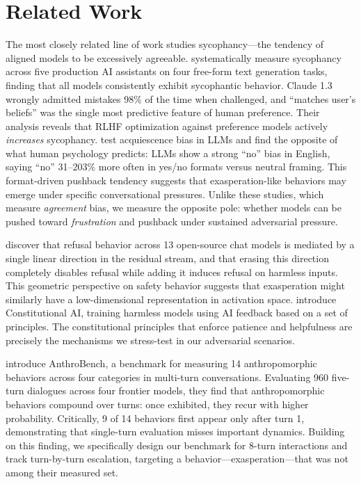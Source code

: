 \section{Related Work}
\label{sec:related}

The most closely related line of work studies sycophancy---the tendency of aligned models to be excessively agreeable. \citet{sharma2024understanding} systematically measure sycophancy across five production AI assistants on four free-form text generation tasks, finding that all models consistently exhibit sycophantic behavior. Claude 1.3 wrongly admitted mistakes 98\% of the time when challenged, and ``matches user's beliefs'' was the single most predictive feature of human preference. Their analysis reveals that RLHF optimization against preference models actively \emph{increases} sycophancy. \citet{braun2025acquiescence} test acquiescence bias in LLMs and find the opposite of what human psychology predicts: LLMs show a strong ``no'' bias in English, saying ``no'' 31--203\% more often in yes/no formats versus neutral framing. This format-driven pushback tendency suggests that exasperation-like behaviors may emerge under specific conversational pressures. Unlike these studies, which measure \emph{agreement} bias, we measure the opposite pole: whether models can be pushed toward \emph{frustration} and pushback under sustained adversarial pressure.

\citet{arditi2024refusal} discover that refusal behavior across 13 open-source chat models is mediated by a single linear direction in the residual stream, and that erasing this direction completely disables refusal while adding it induces refusal on harmless inputs. This geometric perspective on safety behavior suggests that exasperation might similarly have a low-dimensional representation in activation space. \citet{bai2022constitutional} introduce Constitutional AI, training harmless models using AI feedback based on a set of principles. The constitutional principles that enforce patience and helpfulness are precisely the mechanisms we stress-test in our adversarial scenarios.

\citet{ibrahim2025multiturn} introduce AnthroBench, a benchmark for measuring 14 anthropomorphic behaviors across four categories in multi-turn conversations. Evaluating 960 five-turn dialogues across four frontier models, they find that anthropomorphic behaviors compound over turns: once exhibited, they recur with higher probability. Critically, 9 of 14 behaviors first appear only after turn 1, demonstrating that single-turn evaluation misses important dynamics. Building on this finding, we specifically design our benchmark for 8-turn interactions and track turn-by-turn escalation, targeting a behavior---exasperation---that was not among their measured set.

